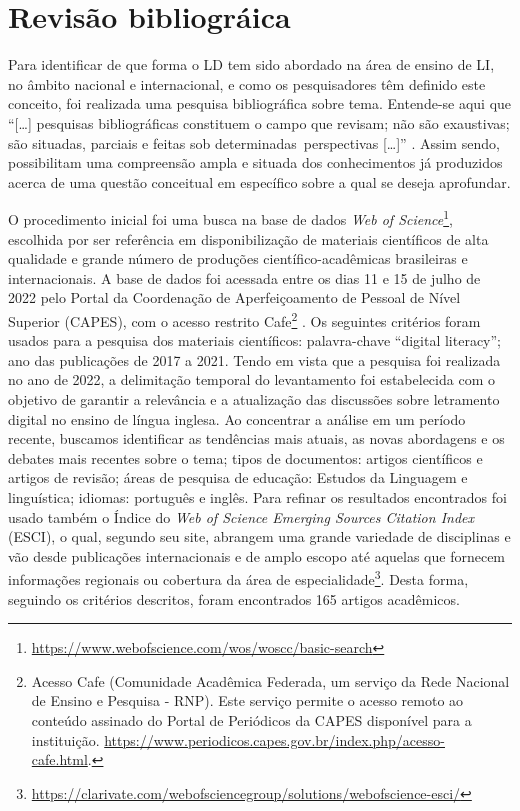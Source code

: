 \section{Revisão bibliográica}\label{sec-revisãobibliográfica}

Para identificar de que forma o LD tem sido abordado na área de ensino
de LI, no âmbito nacional e internacional, e como os pesquisadores têm
definido este conceito, foi realizada uma pesquisa bibliográfica sobre
tema. Entende-se aqui que ``{[}\ldots{]} pesquisas bibliográficas
constituem o campo que revisam; não são exaustivas; são situadas,
parciais e feitas sob determinadas~perspectivas {[}\ldots{]}'' \cite[p.~52]{reis2008pesquisa}. Assim sendo, possibilitam uma compreensão ampla e situada dos
conhecimentos já produzidos acerca de uma questão conceitual em
específico sobre a qual se deseja aprofundar.

O procedimento inicial foi uma busca na base de dados \emph{Web of
Science}\footnote{\url{https://www.webofscience.com/wos/woscc/basic-search}},
escolhida por ser referência em disponibilização de materiais
científicos de alta qualidade e grande número de produções
científico-acadêmicas brasileiras e internacionais. A base de dados foi
acessada entre os dias 11 e 15 de julho de 2022 pelo Portal da
Coordenação de Aperfeiçoamento de Pessoal de Nível Superior (CAPES), com
o acesso restrito Cafe\footnote{Acesso Cafe (Comunidade Acadêmica
  Federada, um serviço da Rede Nacional de Ensino e Pesquisa - RNP).
  Este serviço permite o acesso remoto ao conteúdo assinado do Portal de
  Periódicos da CAPES disponível para a instituição.
  \url{https://www.periodicos.capes.gov.br/index.php/acesso-cafe.html}.} . Os
seguintes critérios foram usados para a pesquisa dos materiais
científicos: palavra-chave ``digital literacy''; ano das publicações de
2017 a 2021. Tendo em vista que a pesquisa foi realizada no ano de 2022,
a delimitação temporal do levantamento foi estabelecida com o objetivo
de garantir a relevância e a atualização das discussões sobre letramento
digital no ensino de língua inglesa. Ao concentrar a análise em um
período recente, buscamos identificar as tendências mais atuais, as
novas abordagens e os debates mais recentes sobre o tema; tipos de
documentos: artigos científicos e artigos de revisão; áreas de pesquisa
de educação: Estudos da Linguagem e linguística; idiomas: português e
inglês. Para refinar os resultados encontrados foi usado também o Índice
do \emph{Web of Science Emerging Sources Citation Index} (ESCI), o qual,
segundo seu site, abrangem uma grande variedade de disciplinas e vão
desde publicações internacionais e de amplo escopo até aquelas que
fornecem informações regionais ou cobertura da área de
especialidade\footnote{\url{https://clarivate.com/webofsciencegroup/solutions/webofscience-esci/}}.
Desta forma, seguindo os critérios descritos, foram encontrados 165
artigos acadêmicos.

